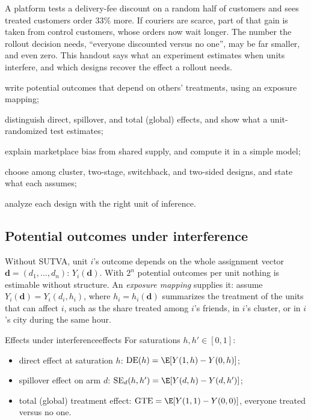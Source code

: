 \documentclass[11pt]{article}
\begin{document}

\begin{decision}
A platform tests a delivery-fee discount on a random half of customers and sees treated customers order 33\%
more. If couriers are scarce, part of that gain is taken from control customers, whose orders now wait longer.
The number the rollout decision needs, ``everyone discounted versus no one'', may be far smaller, and even zero.
This handout says what an experiment estimates when units interfere, and which designs recover the effect a
rollout needs.
\end{decision}

\begin{goals}
  \item write potential outcomes that depend on others' treatments, using an exposure mapping;
  \item distinguish direct, spillover, and total (global) effects, and show what a unit-randomized test estimates;
  \item explain marketplace bias from shared supply, and compute it in a simple model;
  \item choose among cluster, two-stage, switchback, and two-sided designs, and state what each assumes;
  \item analyze each design with the right unit of inference.
\end{goals}

\sectionone

\subsection{Potential outcomes under interference}

Without SUTVA, unit $i$'s outcome depends on the whole assignment vector $\mathbf{d} = (d_1, \dots, d_n)$:
$Y_i(\mathbf{d})$. With $2^n$ potential outcomes per unit nothing is estimable without structure. An
\emph{exposure mapping} supplies it: assume $Y_i(\mathbf{d}) = Y_i(d_i, h_i)$, where $h_i = h_i(\mathbf{d})$ summarizes the
treatment of the units that can affect $i$, such as the share treated among $i$'s friends, in $i$'s cluster, or in
$i$'s city during the same hour.

\begin{defn}{Effects under interference}{effects}
For saturations $h, h' \in [0,1]$:
\begin{itemize}[leftmargin=1.2em]
  \item direct effect at saturation $h$: $\text{DE}(h) = \E[Y(1,h) - Y(0,h)]$;
  \item spillover effect on arm $d$: $\text{SE}_d(h, h') = \E[Y(d,h) - Y(d,h')]$;
  \item total (global) treatment effect: $\text{GTE} = \E[Y(1,1) - Y(0,0)]$, everyone treated versus no one.
\end{itemize}
\end{defn}
\end{document}
